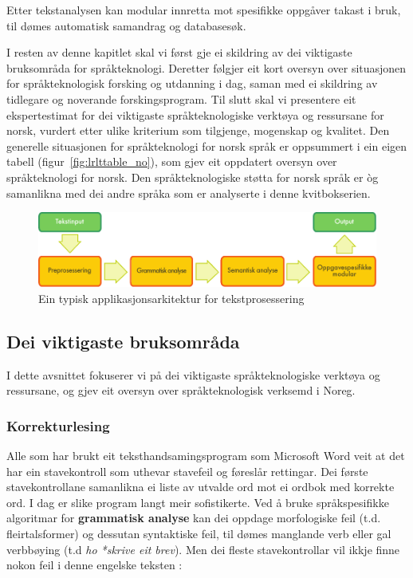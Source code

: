\begin{multicols}{2}
Etter tekstanalysen kan modular innretta mot spesifikke oppgåver takast i bruk, til dømes automatisk samandrag og databasesøk. 

I resten av denne kapitlet skal vi først gje ei skildring av dei viktigaste bruksområda for språkteknologi. Deretter følgjer eit kort oversyn over situasjonen for språkteknologisk forsking og utdanning i dag, saman med ei skildring av tidlegare og noverande forskingsprogram. Til slutt skal vi presentere eit ekspertestimat for dei viktigaste språkteknologiske verktøya og ressursane for norsk, vurdert etter ulike kriterium som tilgjenge, mogenskap og kvalitet. Den generelle situasjonen for språkteknologi for norsk språk er oppsummert i ein eigen tabell (figur~\ref{fig:lrlttable_no}), som gjev eit oppdatert oversyn over språkteknologi for norsk. Den språkteknologiske støtta for norsk språk er òg samanlikna med dei andre språka som er analyserte i denne kvitbokserien. 

\begin{figure}[htb]
  \center
  \includegraphics[width=\textwidth]{../_media/norwegian-nynorsk/text_processing_app_architecture}
  \caption{Ein typisk applikasjonsarkitektur for tekstprosessering}
  \label{fig:textprocessingarch_no}
\end{figure}

\subsection{Dei viktigaste bruksområda}

I dette avsnittet fokuserer vi på dei viktigaste språkteknologiske verktøya og ressursane, og gjev eit oversyn over språkteknologisk verksemd i Noreg.  %

\subsubsection{Korrekturlesing}

Alle som har brukt eit teksthandsamingsprogram som Microsoft Word veit at det har ein stavekontroll som uthevar stavefeil og føreslår rettingar. Dei første stavekontrollane samanlikna ei liste av utvalde ord mot ei ordbok med korrekte ord. I dag er slike program langt meir sofistikerte. Ved å bruke språkspesifikke algoritmar for \textbf{grammatisk analyse} kan dei oppdage morfologiske feil (t.d. fleirtalsformer) og dessutan syntaktiske feil, til dømes manglande verb eller gal verbbøying (t.d \textit{ho *skrive eit brev}). Men dei fleste stavekontrollar vil ikkje finne nokon feil i denne engelske teksten \cite{zar1}:
 

\end{multicols}

